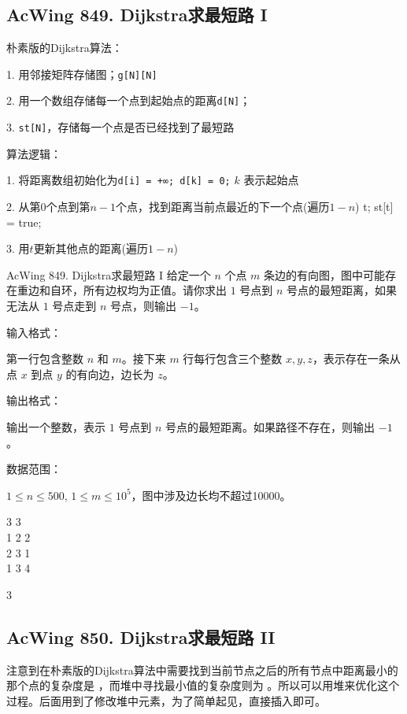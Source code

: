 \subsection{AcWing 849. Dijkstra求最短路 I}

朴素版的Dijkstra算法：

1. 用邻接矩阵存储图；\lstinline{g[N][N]}

2. 用一个数组存储每一个点到起始点的距离\lstinline{d[N]}；

3. \lstinline{st[N]}，存储每一个点是否已经找到了最短路

算法逻辑：

1. 将距离数组初始化为\lstinline{d[i] = +∞; d[k] = 0;} $k$ 表示起始点

2. 从第$0$个点到第$n - 1$个点，找到距离当前点最近的下一个点(遍历$1 - n$) \lstinline{}{t; st[t] = true;}

3. 用$t$更新其他点的距离(遍历$1 - n$)


\begin{titledbox}{AcWing 849. Dijkstra求最短路 I}
给定一个 $n$ 个点 $m$ 条边的有向图，图中可能存在重边和自环，所有边权均为正值。请你求出 $1$ 号点到 $n$ 号点的最短距离，如果无法从 $1$ 号点走到 $n$ 号点，则输出 $-1$。

输入格式：

第一行包含整数 $n$ 和 $m$。接下来 $m$ 行每行包含三个整数 $x,y,z$，表示存在一条从点 $x$ 到点 $y$ 的有向边，边长为 $z$。

输出格式：

输出一个整数，表示 $1$ 号点到 $n$ 号点的最短距离。如果路径不存在，则输出 $-1$。

数据范围：

$1 \le n \le 500$, $1 \le m \le 10^5$，图中涉及边长均不超过10000。

\begin{inputblock}
    3 3 \\
    1 2 2 \\
    2 3 1 \\
    1 3 4
\end{inputblock}
\begin{outputblock}
    3
\end{outputblock}
\end{titledbox}

\subsection{AcWing 850. Dijkstra求最短路 II}

注意到在朴素版的Dijkstra算法中需要找到当前节点之后的所有节点中距离最小的那个点的复杂度是 ，而堆中寻找最小值的复杂度则为 。所以可以用堆来优化这个过程。后面用到了修改堆中元素，为了简单起见，直接插入即可。

